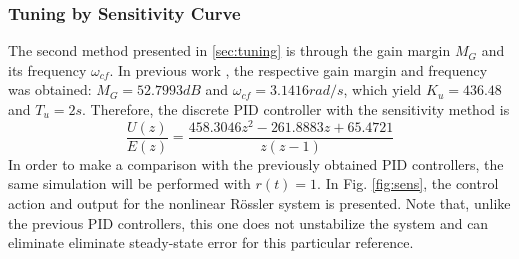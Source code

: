     \subsubsection{Tuning by Sensitivity Curve}
    The second method presented in \ref{sec:tuning} is through the gain margin $M_G$ and its frequency $\omega_{cf}$. In previous work \cite{JS_PL2}, the respective gain margin and frequency was obtained: 
    $M_G=52.7993dB$ and $\omega_{cf}=3.1416rad/s$, which yield $K_u=436.48$ and $T_u=2s$. Therefore, the discrete PID controller with the sensitivity method is
    \begin{equation*}
	    \dfrac{U(z)}{E(z)}=\dfrac{458.3046z^2-261.8883z+65.4721}{z(z-1)}
	\end{equation*}
    In order to make a comparison with the previously obtained PID controllers, the same simulation will be performed with $r(t)=1$. In Fig. \ref{fig:sens}, the control action and output for the nonlinear Rössler system is presented. Note that, unlike the previous PID controllers, this one does not unstabilize the system and can eliminate eliminate steady-state error for this particular reference.
    
